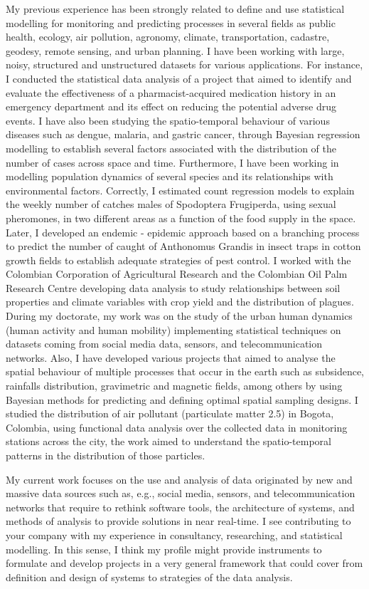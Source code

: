 \documentclass[11pt, a4paper]{awesome-cv}
\begin{document}
\begin{cvletter}
My previous experience has been strongly related to define and use statistical modelling for monitoring and predicting processes in several fields as public health, ecology, air pollution, agronomy, climate, transportation, cadastre, geodesy, remote sensing, and urban planning. I have been working with large, noisy, structured and unstructured datasets for various applications. For instance, I conducted the statistical data analysis of a project that aimed to identify and evaluate the effectiveness of a pharmacist-acquired medication history in an emergency department and its effect on reducing the potential adverse drug events. I have also been studying the spatio-temporal behaviour of various diseases such as dengue, malaria, and gastric cancer, through Bayesian regression modelling to establish several factors associated with the distribution of the number of cases across space and time. Furthermore, I have been working in modelling population dynamics of several species and its relationships with environmental factors. Correctly, I estimated count regression models to explain the weekly number of catches males of Spodoptera Frugiperda, using sexual pheromones, in two different areas as a function of the food supply in the space. Later, I developed an endemic - epidemic approach based on a branching process to predict the number of caught of Anthonomus Grandis in insect traps in cotton growth fields to establish adequate strategies of pest control. I worked with the Colombian Corporation of Agricultural Research and the Colombian Oil Palm Research Centre developing data analysis to study relationships between soil properties and climate variables with crop yield and the distribution of plagues. During my doctorate, my work was on the study of the urban human dynamics (human activity and human mobility) implementing statistical techniques on datasets coming from social media data, sensors, and telecommunication networks. Also, I have developed various projects that aimed to analyse the spatial behaviour of multiple processes that occur in the earth such as subsidence, rainfalls distribution, gravimetric and magnetic fields, among others by using Bayesian methods for predicting and defining optimal spatial sampling designs. I studied the distribution of air pollutant (particulate matter 2.5) in Bogota, Colombia, using functional data analysis over the collected data in monitoring stations across the city, the work aimed to understand the spatio-temporal patterns in the distribution of those particles.\par
My current work focuses on the use and analysis of data originated by new and massive data sources such as, e.g., social media, sensors, and telecommunication networks that require to rethink software tools, the architecture of systems, and methods of analysis to provide solutions in near real-time. I see contributing to your company with my experience in consultancy, researching, and statistical modelling. In this sense, I think my profile might provide instruments to formulate and develop projects in a very general framework that could cover from definition and design of systems to strategies of the data analysis.\par 

\end{cvletter}
\end{document}
